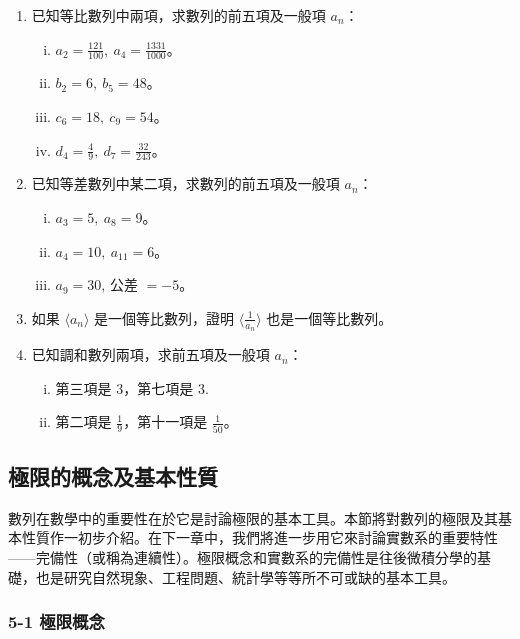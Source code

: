 \begin{enumerate}
    \item 已知等比數列中兩項，求數列的前五項及一般項 $a_n$：
    \begin{enumerate}[(i)]
        \item $a_2=\frac{121}{100},\ a_4=\frac{1331}{1000}$。
        \item $b_2=6,\ b_5=48$。
        \item $c_6=18,\ c_9=54$。
        \item $d_4=\frac{4}{9},\ d_7=\frac{32}{243}$。
    \end{enumerate}

    \item 已知等差數列中某二項，求數列的前五項及一般項 $a_n$：
    \begin{enumerate}[(i)]
        \item $a_3=5,\ a_8=9$。
        \item $a_4=10,\ a_{11}=6$。
        \item $a_9=30$, 公差 $=-5$。
    \end{enumerate}

    \item 如果 $\langle a_n \rangle$ 是一個等比數列，證明 $\langle \frac{1}{a_n} \rangle$ 也是一個等比數列。

    \item 已知調和數列兩項，求前五項及一般項 $a_n$：
    \begin{enumerate}[(i)]
        \item 第三項是 3，第七項是 3.
        \item 第二項是 $\frac{1}{9}$，第十一項是 $\frac{1}{50}$。
    \end{enumerate}
\end{enumerate}

\subsection{極限的概念及基本性質}\label{sec:b2_2-5}

數列在數學中的重要性在於它是討論極限的基本工具。本節將對數列的極限及其基本性質作一初步介紹。在下一章中，我們將進一步用它來討論實數系的重要特性——完備性（或稱為連續性）。極限概念和實數系的完備性是往後微積分學的基礎，也是研究自然現象、工程問題、統計學等等所不可或缺的基本工具。

\subsubsection*{5-1 極限概念}

